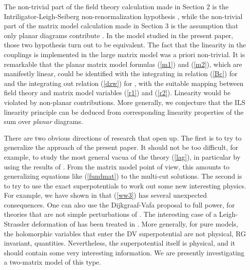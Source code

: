 \documentclass[a4paper,12pt]{article}
\begin{document}
The non-trivial part of the field theory calculation made in Section 2
is the Intriligator-Leigh-Seiberg non-renormalization hypothesis
\cite{ILS}, while the non-trivial part of the matrix model calculation
made in Section 3 is the assumption that only planar diagrams
contribute \cite{DV}. In the model studied in the present paper, those
two hypothesis turn out to be equivalent. The fact that the linearity
in the couplings \coordHE{} is implemented in the large \coordHE{} matrix model
was a priori non-trivial. It is remarkable that the planar matrix
model formulas (\ref{m1}) and (\ref{m2}), which are manifestly linear,
could be identified with the integrating in relation (\ref{Bc}) for
\coordHE{} and the integrating out relation (\ref{dzw}) for \coordHE{}, with the
suitable mapping between field theory and matrix model variables
(\ref{r1}) and (\ref{r2}). Linearity would be violated by
non-planar contributions. More generally, we conjecture that
the ILS linearity principle can be deduced from corresponding
linearity properties of the sum over {\it planar} diagrams.

There are two obvious directions of research that open up. The first 
is to try to generalize the approach of the present paper. It should 
not be too difficult, for example, to study the most general vacua of 
the theory (\ref{lag}), in particular by using the results of \cite{CV}. 
From the matrix model point of view, this amounts to generalizing 
equations like (\ref{fundmat}) to the multi-cut solutions. The second
is to try to use the exact superpotentials to work out some new 
interesting physics. For example, we have shown in \cite{fer} that
(\ref{ww3}) has several unexpected consequences. One can also use
the Dijkgraaf-Vafa proposal to full power, for theories that are not 
simple perturbations of \coordHE{}. The interesting case of a 
Leigh-Strassler deformation of \coordHE{} has been treated in 
\cite{DH}. More generally, for pure \coordHE{} models,
the holomorphic variables that enter 
the DV superpotential are not physical, RG invariant, 
quantities. Nevertheless, the superpotential itself is physical, and 
it should contain some very interesting information. We are
presently investigating a two-matrix model \cite{2M} of this type.
\end{document}
